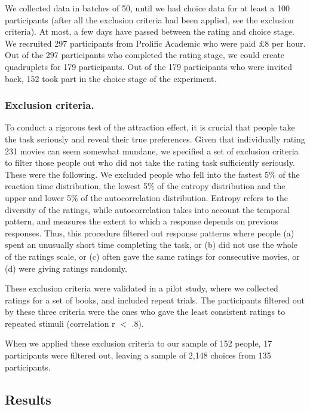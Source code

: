 \documentclass[12pt, a4paper]{article}
\begin{document}
We collected data in batches of 50, until we had choice data for at least a 100 participants (after all the exclusion criteria had been applied, see the exclusion criteria). At most, a few days have passed between the rating and choice stage. We recruited 297 participants from Prolific Academic who were paid £8 per hour. Out of the 297 participants who completed the rating stage, we could create quadruplets for 179 participants. Out of the 179 participants who were invited back, 152 took part in the choice stage of the experiment.

\subsubsection*{Exclusion criteria.} \label{exclusion_ref}

To conduct a rigorous test of the attraction effect, it is crucial that people take the task seriously and reveal their true preferences. Given that individually rating 231 movies can seem somewhat mundane, we specified a set of exclusion criteria to filter those people out who did not take the rating task sufficiently seriously. These were the following. We excluded people who fell into the fastest 5\% of the reaction time distribution, the lowest 5\% of the entropy distribution and the upper and lower 5\% of the autocorrelation distribution. Entropy refers to the diversity of the ratings, while autocorrelation takes into account the temporal pattern, and measures the extent to which a response depends on previous responses. Thus, this procedure filtered out response patterns where people (a) spent an unusually short time completing the task, or (b) did not use the whole of the ratings scale, or (c) often gave the same ratings for consecutive movies, or (d) were giving ratings randomly.

These exclusion criteria were validated in a pilot study, where we collected ratings for a set of books, and included repeat trials. The participants filtered out by these three criteria were the ones who gave the least consistent ratings to repeated stimuli (correlation r $<$ .8).

When we applied these exclusion criteria to our sample of 152 people, 17 participants were filtered out, leaving a sample of 2,148 choices from 135 participants.


\subsection*{Results}
\end{document}
